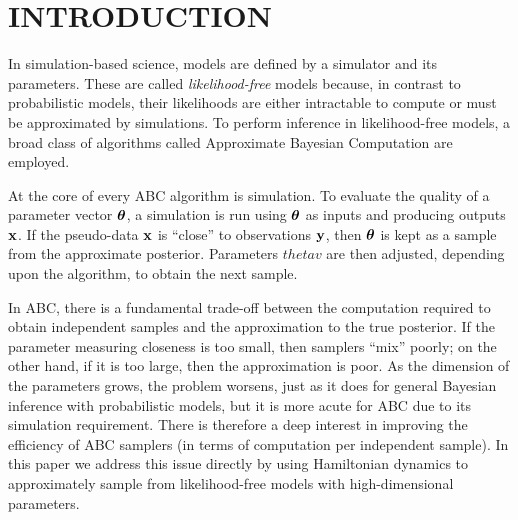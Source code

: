 \documentclass[]{article}
\begin{document}
\begin{abstract}
%
%
%
\end{abstract} 

\section{INTRODUCTION} \label{introduction}
In simulation-based science, models are defined by a simulator and its parameters.  These are called {\em likelihood-free} models because, in contrast to probabilistic models, their likelihoods are either intractable to compute or must be approximated by simulations.  To perform inference in likelihood-free models, a broad class of algorithms called Approximate Bayesian Computation \cite{beaumont2002approximate,marjoram2003markov,sisson2007sequential,sisson:2010,marin:2012,fan:2013} are employed.

At the core of every ABC algorithm is simulation.  To evaluate the quality of a parameter vector ${\bm \theta}$, a simulation is run using ${\bm \theta}$ as inputs and producing outputs ${\bf x}$.  If the pseudo-data ${\bf x}$ is ``close'' to observations ${\bf y}$, then ${\bm \theta}$ is kept as a sample from the approximate posterior.  Parameters $thetav$ are then adjusted, depending upon the algorithm, to obtain the next sample.

In ABC, there is a fundamental trade-off between the computation required to obtain independent samples and the approximation to the true posterior.  If the parameter measuring closeness is too small, then samplers ``mix'' poorly; on the other hand, if it is too large, then the approximation is poor.  As the dimension of the parameters grows, the problem worsens, just as it does for general Bayesian inference with probabilistic models, but it is more acute for ABC due to its simulation requirement.  There is therefore a deep interest in improving the efficiency of ABC samplers (in terms of computation per independent sample).  In this paper we address this issue directly by using Hamiltonian dynamics to approximately sample from likelihood-free models with high-dimensional parameters.
\end{document}
